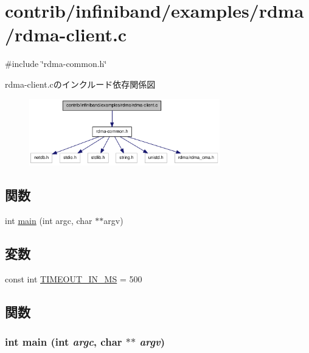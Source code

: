 \hypertarget{rdma-client_8c}{
\section{contrib/infiniband/examples/rdma/rdma-\/client.c}
\label{rdma-client_8c}
}
{\ttfamily \#include \char`\"{}rdma-\/common.h\char`\"{}}\par
rdma-\/client.cのインクルード依存関係図\nopagebreak
\begin{figure}[H]
\begin{center}
\leavevmode
\includegraphics[width=235pt]{rdma-client_8c__incl}
\end{center}
\end{figure}
\subsection*{関数}
\begin{DoxyCompactItemize}
\item 
int \hyperlink{rdma-client_8c_a3c04138a5bfe5d72780bb7e82a18e627}{main} (int argc, char $\ast$$\ast$argv)
\end{DoxyCompactItemize}
\subsection*{変数}
\begin{DoxyCompactItemize}
\item 
const int \hyperlink{rdma-client_8c_a76e9fc9cbd322318bf712c4077ca9251}{TIMEOUT\_\-IN\_\-MS} = 500
\end{DoxyCompactItemize}


\subsection{関数}
\hypertarget{rdma-client_8c_a3c04138a5bfe5d72780bb7e82a18e627}{
\subsubsection[{main}]{\setlength{\rightskip}{0pt plus 5cm}int main (int {\em argc}, \/  char $\ast$$\ast$ {\em argv})}}
\label{rdma-client_8c_a3c04138a5bfe5d72780bb7e82a18e627}


